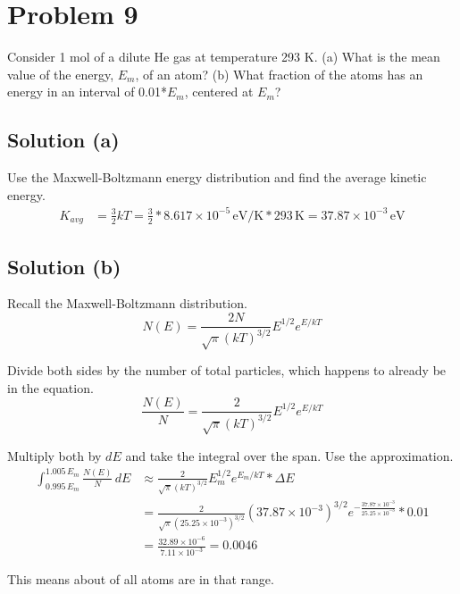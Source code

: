 \documentclass[12pt]{report}
\newcommand{\e}[1]{e^{#1}}
\newcommand{\E}[1]{\times 10^{#1}}
\begin{document}
\section*{Problem 9}
    Consider 1 mol of a dilute He gas at temperature 293 K. 
    (a) What is the mean value of the energy, $E_m$, of an atom? 
    (b) What fraction of the atoms has an energy in an interval of 0.01*$E_m$, centered at $E_m$? 

    \subsection*{Solution (a)}
        Use the Maxwell-Boltzmann energy distribution and find the average kinetic energy.
        \begin{align*}
            K_{avg} &=  \frac{3}{2}kT
                =   \frac{3}{2} * 8.617\E{-5}\,\unit{\eV/\kelvin} * 293\,\unit{\kelvin}
                =   \boxed{37.87\E{-3}\,\unit{\eV}}
        \end{align*}

    \subsection*{Solution (b)}
        Recall the Maxwell-Boltzmann distribution.
        \begin{equation*}
            N(E) = \frac{2N}{\sqrt{\pi}(kT)^{3/2}}E^{1/2}\e{E/kT}
        \end{equation*}

        Divide both sides by the number of total particles, which happens to already be in the equation.
        \begin{equation*}
            \frac{N(E)}{N} = \frac{2}{\sqrt{\pi}(kT)^{3/2}}E^{1/2}\e{E/kT}
        \end{equation*}

        Multiply both by $dE$ and take the integral over the span.
        Use the approximation.
        \begin{align*}
            \int_{0.995\,E_m}^{1.005\,E_m}\frac{N(E)}{N}\,dE    &\approx    \frac{2}{\sqrt{\pi}(kT)^{3/2}}E_m^{1/2}\e{E_m/kT} * \Delta E\\
                &=  \frac{2}{\sqrt{\pi}(25.25\E{-3})^{3/2}}(37.87\E{-3})^{3/2}\e{-\frac{37.87\E{-3}}{25.25\E{-3}}} * 0.01\\
                &=  \frac{32.89\E{-6}}{7.11\E{-3}}
                =   0.0046
        \end{align*}

        This means about  of all atoms are in that range.
    \pagebreak
\end{document}
